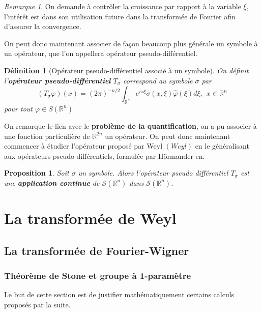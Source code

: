 \documentclass[a4paper, 12pt]{report}
\renewcommand{\.}{\cdot} %
\newcommand\emptypage{
    \null
    \thispagestyle{empty}
    
    \newpage
    }
\theoremstyle{break}
\newtheorem{definition}{Définition}
\newtheorem{proposition}{Proposition}
\theoremstyle{remark}
\newtheorem{remark}{Remarque}
\theoremstyle{proofstyle}
\begin{document}
\begin{remark}
    On demande à contrôler la croissance par rapport à la variable $\xi$, l'intérêt est dans son utilisation future dans la transformée de Fourier afin d'assurer la convergence.
\end{remark}

On peut donc maintenant associer de façon beaucoup plus générale un symbole à un opérateur, que l'on appellera opérateur pseudo-différentiel.

\begin{definition}[Opérateur pseudo-différentiel associé à un symbole]

    On définit l'\textbf{opérateur pseudo-différentiel} $T_\sigma$ correspond au symbole $\sigma$ par
    $$(T_\sigma \varphi)(x) = (2\pi)^{-n/2} \int_{\mathbb{R}^n} e^{ix \xi} \sigma(x, \xi) \hat{\varphi} (\xi) d \xi, ~~ x \in \mathbb{R}^n$$
    pour tout $\varphi \in S(\mathbb{R}^n)$
\end{definition}

On remarque le lien avec le \textbf{problème de la quantification}, on a pu associer à une fonction particulière de $\mathbb{R}^{2n}$ un opérateur. On peut donc maintenant commencer à étudier l'opérateur proposé par Weyl $(Weyl)$ en le généralisant aux opérateurs pseudo-différentiels, formulée par Hörmander en.

\begin{proposition}
    Soit $\sigma$ un symbole. Alors l'opérateur pseudo différentiel $T_\sigma$ est une \textbf{application continue} de $\mathcal{S}(\mathbb{R}^n)$ dans $\mathcal{S}(\mathbb{R}^n)$.
\end{proposition}

\emptypage
\emptypage
\chapter{La transformée de Weyl} %

\section{La transformée de Fourier-Wigner} %

\subsection{Théorème de Stone et groupe à 1-paramètre}

Le but de cette section est de justifier mathématiquement certains calculs proposés par la suite.
\end{document}
